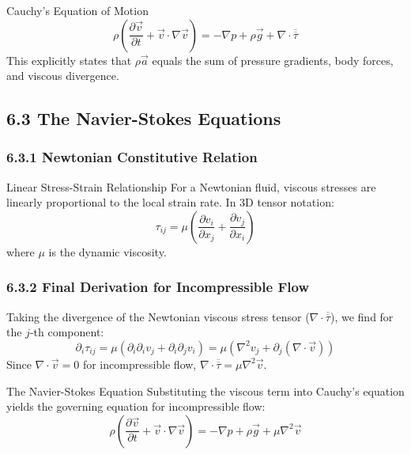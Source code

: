 \begin{mainbox}{Cauchy's Equation of Motion}
\begin{equation*}
    \rho \left( \frac{\partial \vec{v}}{\partial t} + \vec{v} \cdot \nabla \vec{v} \right) = -\nabla p + \rho \vec{g} + \nabla \cdot \overline{\overline{\tau}}
\end{equation*}
This explicitly states that $\rho \vec{a}$ equals the sum of pressure gradients, body forces, and viscous divergence.
\end{mainbox}

\subsection{6.3 The Navier-Stokes Equations}

\subsubsection{6.3.1 Newtonian Constitutive Relation}
\begin{defbox}{Linear Stress-Strain Relationship}
For a Newtonian fluid, viscous stresses are linearly proportional to the local strain rate. In 3D tensor notation:
\begin{equation*}
    \tau_{ij} = \mu \left( \frac{\partial v_i}{\partial x_j} + \frac{\partial v_j}{\partial x_i} \right)
\end{equation*}
where $\mu$ is the dynamic viscosity.
\end{defbox}

\subsubsection{6.3.2 Final Derivation for Incompressible Flow}
Taking the divergence of the Newtonian viscous stress tensor ($\nabla \cdot \overline{\overline{\tau}}$), we find for the $j$-th component:
\begin{equation*}
    \partial_i \tau_{ij} = \mu (\partial_i \partial_i v_j + \partial_i \partial_j v_i) = \mu (\nabla^2 v_j + \partial_j(\nabla \cdot \vec{v}))
\end{equation*}
Since $\nabla \cdot \vec{v} = 0$ for incompressible flow, $\nabla \cdot \overline{\overline{\tau}} = \mu \nabla^2 \vec{v}$.

\begin{resultboxnamed}{The Navier-Stokes Equation}
Substituting the viscous term into Cauchy's equation yields the governing equation for incompressible flow:
\begin{equation*}
    \rho \left( \frac{\partial \vec{v}}{\partial t} + \vec{v} \cdot \nabla \vec{v} \right) = -\nabla p + \rho \vec{g} + \mu \nabla^2 \vec{v}
\end{equation*}
\end{resultboxnamed}